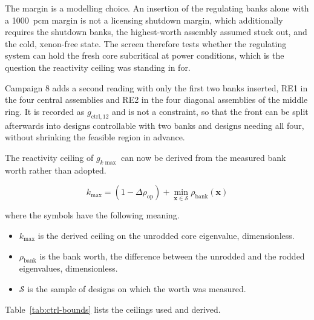 The margin is a modelling choice. An insertion of the regulating banks
alone with a \SI{1000}{pcm} margin is not a licensing shutdown margin,
which additionally requires the shutdown banks, the highest-worth
assembly assumed stuck out, and the cold, xenon-free state. The screen
therefore tests whether the regulating system can hold the fresh core
subcritical at power conditions, which is the question the reactivity
ceiling was standing in for.

Campaign 8 adds a second reading with only the first two banks
inserted, RE1 in the four central assemblies and RE2 in the four
diagonal assemblies of the middle ring. It is recorded as
$g_\mathrm{ctrl,12}$ and is not a constraint, so that the front can be
split afterwards into designs controllable with two banks and designs
needing all four, without shrinking the feasible region in advance.

The reactivity ceiling of $g_{k\max}$ can now be derived from the
measured bank worth rather than adopted.

\begin{equation}
k_{\max} = (1 - \Delta\rho_\mathrm{op}) + \min_{\mathbf{x} \in \mathcal{S}} \rho_\mathrm{bank}(\mathbf{x})
\label{eq:k-max-derived}
\end{equation}

\noindent where the symbols have the following meaning.

\begin{itemize}
  \item $k_{\max}$ is the derived ceiling on the unrodded core
        eigenvalue, dimensionless.

  \item $\rho_\mathrm{bank}$ is the bank worth, the difference between
        the unrodded and the rodded eigenvalues, dimensionless.

  \item $\mathcal{S}$ is the sample of designs on which the worth was
        measured.
\end{itemize}

Table~\ref{tab:ctrl-bounds} lists the ceilings used and derived.

